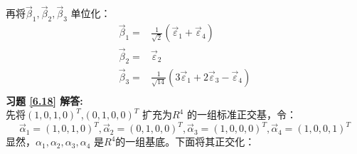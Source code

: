 再将$\vec{\beta}_1,\vec{\beta}_2,\vec{\beta}_3$ 单位化：
\begin{align*}
\vec{\beta}_1=&\frac{1}{\sqrt{2}}(\vec{\varepsilon}_1+\vec{\varepsilon}_4)\\
\vec{\beta}_2=&\vec{\varepsilon}_2\\
\vec{\beta}_3=&\frac{1}{\sqrt{14}}(3\vec{\varepsilon}_1+2\vec{\varepsilon}_3-\vec{\varepsilon}_4)\\
\end{align*}
\textbf{习题 \ref{6.18} 解答:}\\
先将$(1,0,1,0)^T$,$(0,1,0,0)^T$ 扩充为$R^4$ 的一组标准正交基，令：
\begin{equation*}
\vec{\alpha}_1=(1,0,1,0)^T,\vec{\alpha}_2=(0,1,0,0)^T,\vec{\alpha}_3=(1,0,0,0)^T,\vec{\alpha}_4=(1,0,0,1)^T
\end{equation*}
显然，$\alpha_1,\alpha_2,\alpha_3,\alpha_4$ 是$R^4$的一组基底。下面将其正交化：
